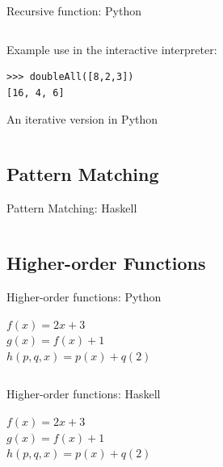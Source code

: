 \documentclass{beamer}
\begin{document}
\begin{frame}[fragile]{Recursive function: Python}

  \inputminted[firstline=3]{python}{code/doubleall_recursion.py}

  \vskip5mm

Example use in the interactive interpreter:

  \begin{verbatim}
>>> doubleAll([8,2,3])
[16, 4, 6]
  \end{verbatim}

\end{frame}

\begin{frame}{An iterative version in Python}

  \inputminted[firstline=3]{python}{code/doubleall_iterative.py}

\end{frame}

\subsection{Pattern Matching}

\begin{frame}{Pattern Matching: Haskell}

  \inputminted[lastline=3]{haskell}{code/doubleall_recursion.hs}

\end{frame}

\subsection{Higher-order Functions}

\begin{frame}{Higher-order functions: Python}

  {\large $f(x) = 2x + 3$}\\
  {\large $g(x) = f(x) + 1$}\\
  {\large $h(p, q, x) = p(x) + q(2)$}\\

  \vskip5mm

  \inputminted[firstline=3,lastline=10]{python}{code/higher_order.py}

\end{frame}

\begin{frame}{Higher-order functions: Haskell}

  {\large $f(x) = 2x + 3$}\\
  {\large $g(x) = f(x) + 1$}\\
  {\large $h(p, q, x) = p(x) + q(2)$}\\

  \vskip5mm

  \inputminted[lastline=5]{haskell}{code/higher_order.hs}

\end{frame}
\end{document}
